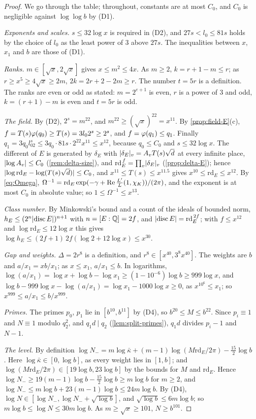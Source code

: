 \begin{proof}
We go through the table; throughout, constants are at most $C_0$, and $C_0$ is negligible against $\log\log b$ by (D1).

\emph{Exponents and scales.} $s\le32\log x$ is required in (D2), and $27s<l_0\le81s$ holds by the choice of $l_0$ as the least power of $3$ above $27s$. The inequalities between $x$, $x_1$ and $b$ are those of (D1).

\emph{Ranks.} $m\in[\sqrt x,2\sqrt x]$ gives $x\le m^2\le4x$. As $m\ge2$, $k=r+1-m\le r$; as $r\ge x^5\ge4\sqrt x\ge2m$, $2k=2r+2-2m\ge r$. The number $t=5r$ is a definition. The ranks are even or odd as stated: $m=2^{e+1}$ is even, $r$ is a power of $3$ and odd, $k=(r+1)-m$ is even and $t=5r$ is odd.

\emph{The field.} By (D2), $2^s=m^{22}$, and $m^{22}\ge(\sqrt x)^{22}=x^{11}$. By \cref{prop:field-E}(c), $f=T(s)\varphi(q_0)\ge T(s)=3l_02^s\ge2^s$, and $f=\varphi(q_1)\le q_1$. Finally $q_1=3q_0l_02^s\le3q_0\cdot81s\cdot2^{22}x^{11}\le x^{12}$, because $q_0\le C_0$ and $s\le32\log x$. The different of $E$ is generated by
$\delta_E$ with $\lvert \delta_E\rvert_v=A_vT(s)\sqrt d$ at every infinite place, $\lvert \log A_v\rvert\le C_0$ (\cref{rem:delta-size}), and $\mathrm{rd}_E^{\,f}=\prod_v\lvert \delta_E\rvert_v$ (\cref{prop:delta-E}); hence $\lvert \log\mathrm{rd}_E-\log(T(s)\sqrt d)\rvert\le C_0$, and $x^{11}\le T(s)\le x^{11.5}$ gives $x^{10}\le\mathrm{rd}_E\le x^{12}$. By \eqref{eq:Omega},
$\Omega^{-1}=\mathrm{rd}_E\exp(-\gamma+\operatorname{Re}\tfrac{L'}L(1,\chi_K))/(2\pi)$, and the exponent is at most $C_0$ in absolute value; so $1\le\Omega^{-1}\le x^{13}$.

\emph{Class number.} By Minkowski's bound and a count of the ideals of bounded norm, $h_E\le(2^n\lvert \operatorname{disc} E\rvert)^{n+1}$ with $n=[E:\mathbb{Q}]=2f$, and $\lvert \operatorname{disc} E\rvert=\mathrm{rd}_E^{\,2f}$; with $f\le x^{12}$ and $\log\mathrm{rd}_E\le12\log x$ this gives $\log h_E\le(2f+1)\,2f(\log2+12\log x)\le x^{30}$.

\emph{Gap and weights.} $\Delta=2r^8$ is a definition, and $r^8\in[x^{40},3^8x^{40}]$. The weights are $b$ and $a/x_1=xb/x_1$; as $x\le x_1$, $a/x_1\le b$. In logarithms, $\log(a/x_1)=\log x+\log b-\log x_1\ge(1-10^{-6})\log b\ge999\log x$, and $\log b-999\log x-\log(a/x_1)=\log x_1-1000\log x\ge0$, as $x^{10^6}\le x_1$; so $x^{999}\le a/x_1\le b/x^{999}$.

\emph{Primes.} The primes $p_0$, $p_1$ lie in $[b^{10},b^{11}]$ by (D4), so $b^{20}\le M\le b^{22}$. Since $p_i\equiv1$ and $N\equiv1$ modulo $q_2^2$, and $q_1d\mid q_2$ (\cref{lem:split-primes}), $q_1d$ divides $p_i-1$ and $N-1$.

\emph{The level.} By definition $\log N_-=m\log\bar\kappa+(m-1)\log(M\mathrm{rd}_E/2\pi)-\tfrac{15}2\log b$. Here $\log\bar\kappa\in[0,\log b]$, as every weight lies in $[1,b]$; and $\log(M\mathrm{rd}_E/2\pi)\in[19\log b,23\log b]$ by the bounds for $M$ and $\mathrm{rd}_E$. Hence $\log N_-\ge19(m-1)\log b-\tfrac{15}2\log b\ge m\log b$ for $m\ge2$, and $\log N_-\le m\log b+23(m-1)\log b\le24m\log b$. By (D4),
$\log N\in[\log N_-,\log N_-+\sqrt{\log b}]$, and $\sqrt{\log b}\le6m\log b$; so $m\log b\le\log N\le30m\log b$. As $m\ge\sqrt x\ge101$, $N\ge b^{101}$.
\end{proof}


